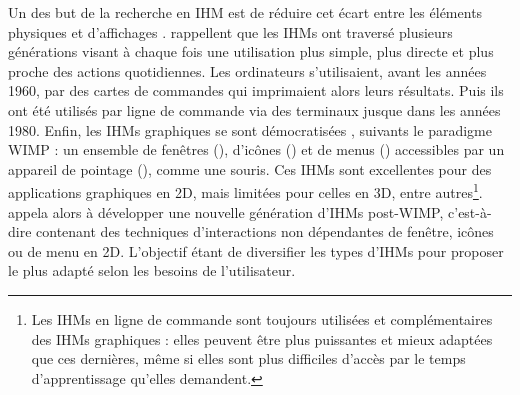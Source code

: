 Un des but de la recherche en IHM est de réduire cet écart entre les éléments physiques et d'affichages \cite{VanDam1997}. \cite{Jacob2008} rappellent que les IHMs ont traversé plusieurs générations visant à chaque fois une utilisation plus simple, plus directe et plus proche des actions quotidiennes. Les ordinateurs s'utilisaient, avant les années 1960, par des cartes de commandes qui imprimaient alors leurs résultats. Puis ils ont été utilisés par ligne de commande via des terminaux jusque dans les années 1980. Enfin, les IHMs graphiques se sont démocratisées , suivants le paradigme WIMP : un ensemble de fenêtres (), d'icônes () et de menus () accessibles par un appareil de pointage (), comme une souris. Ces IHMs sont excellentes pour des applications graphiques en 2D, mais limitées pour celles en 3D, entre autres\footnote{Les IHMs en ligne de commande sont toujours utilisées et complémentaires des IHMs graphiques : elles peuvent être plus puissantes et mieux adaptées que ces dernières, même si elles sont plus difficiles d'accès par le temps d'apprentissage qu'elles demandent.}. \cite{VanDam1997} appela alors à développer une nouvelle génération d'IHMs post-WIMP, c'est-à-dire contenant des techniques d'interactions non dépendantes de fenêtre, icônes ou de menu en 2D. L'objectif étant de diversifier les types d'IHMs pour proposer le plus adapté selon les besoins de l'utilisateur.



